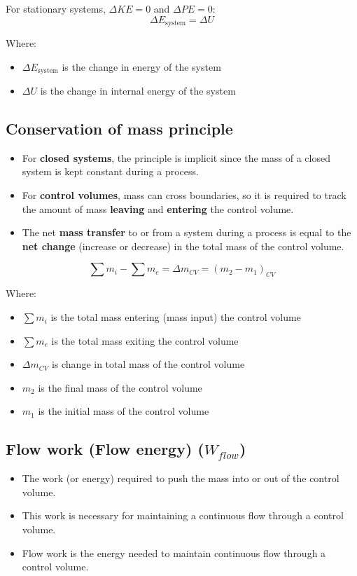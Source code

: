 \documentclass[11pt]{article}
\begin{document}
For stationary systems, \(\Delta KE = 0\) and \(\Delta PE = 0\):
\[\Delta E_{\text{system}} = \Delta U\]

Where:
\begin{itemize}
\item \(\Delta E_{\text{system}}\) is the change in energy of the system
\item \(\Delta U\) is the change in internal energy of the system
\end{itemize}

\subsection{Conservation of mass principle}
\label{sec:orgfc2f068}
\begin{itemize}
\item For \textbf{closed systems}, the principle is implicit since the mass of a closed system is kept constant during a process.
\item For \textbf{control volumes}, mass can cross boundaries, so it is required to track the amount of mass \textbf{leaving} and \textbf{entering} the control volume.
\item The net \textbf{mass transfer} to or from a system during a process is equal to the \textbf{net change} (increase or decrease) in the total mass of the control volume.
\end{itemize}

\[\sum m_{i} - \sum m_{e} = \Delta m_{CV} = \left(m_2 - m_1 \right)_{CV}\]

Where:
\begin{itemize}
\item \(\sum m_{i}\) is the total mass entering (mass input) the control volume
\item \(\sum m_{e}\) is the total mass exiting the control volume
\item \(\Delta m_{CV}\) is change in total mass of the control volume
\item \(m_2\) is the final mass of the control volume
\item \(m_1\) is the initial mass of the control volume
\end{itemize}

\newpage

\subsection{Flow work (Flow energy) (\(W_{flow}\))}
\label{sec:orgd98f65b}
\begin{itemize}
\item The work (or energy) required to push the mass into or out of the control volume.
\item This work is necessary for maintaining a continuous flow through a control volume.
\item Flow work is the energy needed to maintain continuous flow through a control volume.
\end{itemize}
\end{document}
